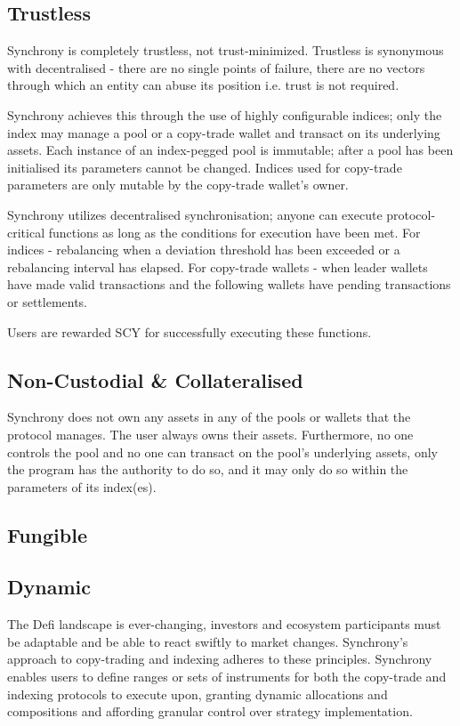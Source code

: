 \documentclass[10pt]{article}
\begin{document}
					\subsection{Trustless}
					Synchrony is completely trustless, not trust-minimized. Trustless is synonymous
					with decentralised - there are no single points of failure, there are no vectors
					through which an entity can abuse its position i.e. trust is not required. \par
					Synchrony achieves this through the use of highly configurable indices; only
					the index may manage a pool or a copy-trade wallet and transact on its
					underlying assets. Each instance of an index-pegged pool is immutable; after
					a pool has been initialised its parameters cannot be changed. Indices used for
					copy-trade parameters are only mutable by the copy-trade wallet's owner.\par
					Synchrony utilizes decentralised synchronisation; anyone can execute
					protocol-critical functions as long as the conditions for execution have been
					met. For indices - rebalancing when a deviation threshold has been exceeded or
					a rebalancing interval has elapsed. For copy-trade wallets - when leader wallets
					have made valid transactions and the following wallets have pending transactions
					or settlements. \par
					Users are rewarded SCY for successfully executing these functions.
					\subsection{Non-Custodial \& Collateralised}
					Synchrony does not own any assets in any of the pools or wallets that the
					protocol manages. The user always owns their assets. Furthermore, no one
					controls the pool and no one can transact on the pool's underlying assets, only
					the program has the authority to do so, and it may only do so within the
					parameters of its index(es).
					\subsection{Fungible}
					\subsection{Dynamic}
					The Defi landscape is ever-changing, investors and ecosystem participants must
					be adaptable and be able to react swiftly to market changes. Synchrony's
					approach to copy-trading and indexing adheres to these principles. Synchrony
					enables users to define ranges or sets of instruments for both the copy-trade
					and indexing protocols to execute upon, granting dynamic allocations and
					compositions and affording granular control over strategy implementation.
\end{document}
